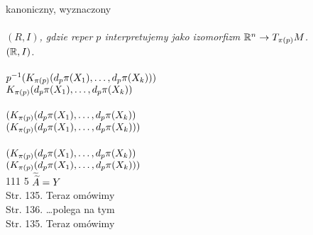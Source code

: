 \documentclass[a4paper,11pt]{article}
\begin{document}
\Pow  kanoniczny, wyznaczony \\
 \\
\Jest \emph{$( R, I )$, gdzie reper $p$ interpretujemy jako izomorfizm
  $\mathbb{R}^{ n } \to T_{ \pi( p ) }M$.} \\
\Pow \emph{$( \mathbb{R}, I )$.} \\
 \\
\Jest $p^{ -1 }( K_{ \pi( p ) }( d_{ p }\pi( X_{ 1 } ), \ldots, d_{ p }\pi( X_{ k } ) ) )$ \\
\Pow  $K_{ \pi( p ) }( d_{ p }\pi( X_{ 1 } ), \ldots, d_{ p }\pi( X_{ k } ) )$ \\
 \\
\Jest $( K_{ \pi( p ) }( d_{ p }\pi( X_{ 1 } ), \ldots,
d_{ p }\pi( X_{ k } ) )$ \\
\Pow $( K_{ \pi( p ) }( d_{ p }\pi( X_{ 1 } ), \ldots,
d_{ p }\pi( X_{ k } ) ) )$ \\
 \\
\Jest $( K_{ \pi( p ) }( d_{ p }\pi( X_{ 1 } ), \ldots,
d_{ p }\pi( X_{ k } ) )$ \\
\Pow $( K_{ \pi( p ) }( d_{ p }\pi( X_{ 1 } ), \ldots,
d_{ p }\pi( X_{ k } ) ) )$ \\


111 5 $\widetilde{ \widetilde{ A } } = Y$ \\
Str. 135. Teraz omówimy\ld \\
Str. 136. \ldots polega na tym\ld \\
Str. 135. Teraz omówimy\ld \\





 {}



\end{document}
